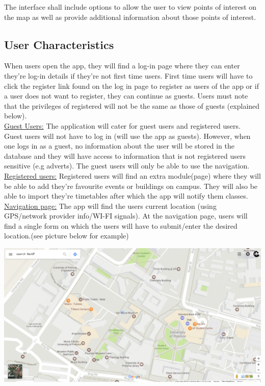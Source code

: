 \documentclass[12pt]{article}
\begin{document}
	The interface shall include options to allow the user to view points of interest on the map as well as provide additional information about those points of interest.\\
	
	\subsection{User Characteristics}
	When users open the app, they will find a log-in page where they can enter they're log-in details if they're not first time users. First time users will have to click the register link found on the log in page to register as users of the app or if a user does not want to register, they can continue as guests. Users must note that the privileges of registered will not be the same as those of guests (explained below). \\
	
	\underline {Guest Users:}
	The application will cater for guest users and registered users. Guest users will not have to log in (will use the app as guests). However, when one logs in as a guest, no information about the user will be stored in the database and they will have access to information that is not registered users sensitive (e.g adverts). The guest users will only be able to use the navigation.\\
	
	\underline{Registered users:}
	Registered users will find an extra module(page) where they will be able to add they're favourite events or buildings on campus. They will also be able to import they're timetables after which the app will notify them classes.\\
	
	\underline{Navigation page:}
	The app will find the users current location (using GPS/network provider info/WI-FI signals). At the navigation page, users will find a single form on which the users will have to submit/enter the desired location.(see picture below for example)\\
	
	
	\begin{center}
	\includegraphics{1.png}
	\end{center}
	
\end{document}
